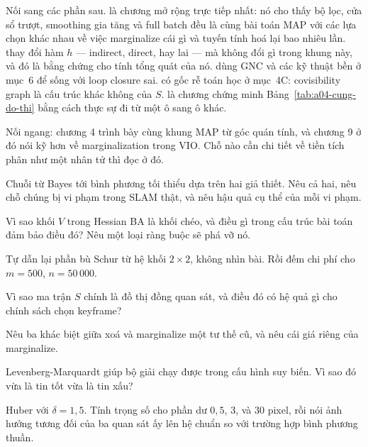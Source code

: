 \documentclass[../../vslam.tex]{subfiles}
\begin{document}
Nối sang các phần sau.  là chương mở rộng trực tiếp nhất: nó cho thấy bộ lọc, cửa sổ trượt, smoothing gia tăng và full batch đều là cùng bài toán MAP với các lựa chọn khác nhau về việc marginalize cái gì và tuyến tính hoá lại bao nhiêu lần.  thay đổi hàm \(h\) --- indirect, direct, hay lai --- mà không đổi gì trong khung này, và đó là bằng chứng cho tính tổng quát của nó.  dùng GNC và các kỹ thuật bền ở mục~6 để sống với loop closure sai.  có gốc rễ toán học ở mục~4C: covisibility graph là cấu trúc khác không của \(S\).  là chương chứng minh Bảng~\ref{tab:a04-cung-do-thi} bằng cách thực sự đi từ một ô sang ô khác.

Nối ngang:  chương 4 trình bày cùng khung MAP từ góc quán tính, và chương 9 ở đó nói kỹ hơn về marginalization trong VIO. Chỗ nào cần chi tiết về tiền tích phân như một nhân tử thì đọc ở đó.

\begin{tukiem}
\item Chuỗi từ Bayes tới bình phương tối thiểu dựa trên hai giả thiết. Nêu cả hai, nêu chỗ chúng bị vi phạm trong SLAM thật, và nêu hậu quả cụ thể của mỗi vi phạm.
\item Vì sao khối \(V\) trong Hessian BA là khối chéo, và điều gì trong cấu trúc bài toán đảm bảo điều đó? Nêu một loại ràng buộc sẽ phá vỡ nó.
\item Tự dẫn lại phần bù Schur từ hệ khối \(2\times2\), không nhìn bài. Rồi đếm chi phí cho \(m=500\), \(n=50\,000\).
\item Vì sao ma trận \(S\) chính là đồ thị đồng quan sát, và điều đó có hệ quả gì cho chính sách chọn keyframe?
\item Nêu ba khác biệt giữa xoá và marginalize một tư thế cũ, và nêu cái giá riêng của marginalize.
\item Levenberg-Marquardt giúp bộ giải chạy được trong cấu hình suy biến. Vì sao đó vừa là tin tốt vừa là tin xấu?
\item Huber với \(\delta = 1{,}5\). Tính trọng số cho phần dư \(0{,}5\), \(3\), và \(30\) pixel, rồi nói ảnh hưởng tương đối của ba quan sát ấy lên hệ chuẩn so với trường hợp bình phương thuần.
\end{tukiem}
\ifSubfilesClassLoaded{\printbibliography[title={Nguồn}]}{}
\end{document}
